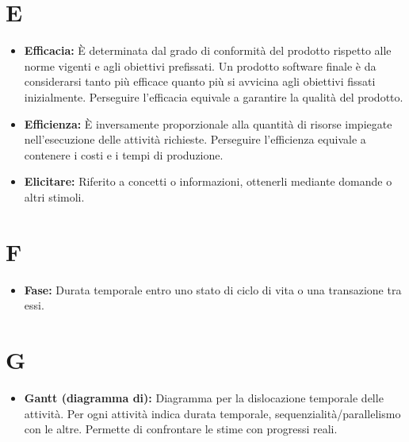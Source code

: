 \documentclass[a4paper]{article}
\begin{document}
	\section*{E}
		\begin{itemize}
			\item \textbf{Efficacia:} È determinata dal grado di conformità del prodotto rispetto alle norme vigenti e 
			agli obiettivi prefissati. Un prodotto software finale è da considerarsi tanto più efficace quanto più si 
			avvicina agli obiettivi fissati inizialmente. Perseguire l'efficacia equivale a garantire la qualità del prodotto.
			\item \textbf{Efficienza:} È inversamente proporzionale alla quantità di risorse impiegate nell'esecuzione 
			delle attività richieste. Perseguire l'efficienza equivale a contenere i costi e i tempi di produzione.
			\item \textbf{Elicitare:} Riferito a concetti o informazioni, ottenerli mediante domande o altri stimoli.
		\end{itemize}
		
	\section*{F}
		\begin{itemize}
			\item \textbf{Fase:} Durata temporale entro uno stato di ciclo di vita o una transazione tra essi.
		\end{itemize}
		
	\section*{G}
		\begin{itemize}
			\item \textbf{Gantt (diagramma di):} Diagramma per la dislocazione temporale delle attività. Per ogni 
			attività indica durata temporale, sequenzialità/parallelismo con le altre. Permette di confrontare le 
			stime con progressi reali.
		\end{itemize}
		
\end{document}

